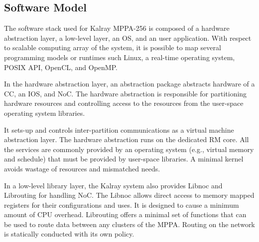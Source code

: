 \documentclass[conference,compsoc]{IEEEtran}
\newcommand{\comment}[1]{}
\begin{document}
\vspace{-3mm}
\subsection{Software Model}
\label{sec:software_model}
\vspace{-3mm}
The software stack used for Kalray MPPA-256 is composed of a hardware abstraction layer, a low-level layer, an OS, and an user application.
With respect to scalable computing array of the system, it is possible to map several programming models or runtimes such Linux, a real-time operating system, POSIX API, OpenCL, and OpenMP.

In the hardware abstraction layer, an abstraction package abstracts hardware of a CC, an IOS, and NoC.
\comment{1-15} %
The hardware abstraction is responsible for partitioning hardware resources and controlling access to the resources from the user-space operating system libraries.
\comment{1-16} 
It sets-up and controls inter-partition communications as a virtual machine abstraction layer.
The hardware abstraction runs on the dedicated RM core.
All the services are commonly provided by an operating system (e.g., virtual memory and schedule) that must be provided by user-space libraries.
A minimal kernel avoids wastage of resources and mismatched needs.

In a low-level library layer, the Kalray system also provides Libnoc and Librouting for handling NoC.
The Libnoc allows direct access to memory mapped registers for their configurations and uses.
It is designed to cause a minimum amount of CPU overhead.
Librouting offers a minimal set of functions that can be used to route data between any clusters of the MPPA.
Routing on the network is statically conducted with its own policy.
\end{document}

